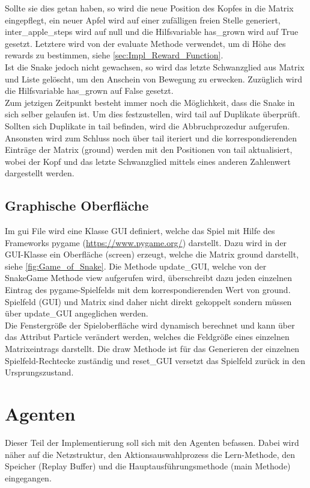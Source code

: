Sollte sie dies getan haben, so wird die neue Position des Kopfes in die Matrix eingepflegt, ein neuer Apfel wird auf einer zufälligen freien Stelle generiert, inter\_apple\_steps wird auf null und die Hilfsvariable has\_grown wird auf True gesetzt. Letztere wird von der evaluate Methode verwendet, um di Höhe des rewards zu bestimmen, siehe \ref{sec:Impl_Reward_Function}.\\
Ist die Snake jedoch nicht gewachsen, so wird das letzte Schwanzglied aus Matrix und Liste gelöscht, um den Anschein von Bewegung zu erwecken. Zuzüglich wird  die Hilfsvariable has\_grown auf False gesetzt.\\
Zum jetzigen Zeitpunkt besteht immer noch die Möglichkeit, dass die Snake in sich selber gelaufen ist. Um dies festzustellen, wird tail auf Duplikate überprüft. Sollten sich Duplikate in tail befinden, wird die Abbruchprozedur aufgerufen.\\
Ansonsten wird zum Schluss noch über tail iteriert und die korrespondierenden Einträge der Matrix (ground) werden mit den Positionen von tail aktualisiert, wobei der Kopf und das letzte Schwanzglied mittels eines anderen Zahlenwert dargestellt werden.


\subsection{Graphische Oberfläche} \label{sec:Impl_GUI}
Im gui File wird eine Klasse GUI definiert, welche das Spiel mit Hilfe des Frameworks pygame (\url{https://www.pygame.org/}) darstellt. Dazu wird in der GUI-Klasse ein Oberfläche (screen) erzeugt, welche die Matrix ground darstellt, siehe \ref{fig:Game_of_Snake}. 
Die Methode update\_GUI, welche von der SnakeGame Methode view aufgerufen wird, überschreibt dazu jeden einzelnen Eintrag des pygame-Spielfelds mit dem korrespondierenden Wert von ground. 
Spielfeld (GUI) und Matrix sind daher nicht direkt gekoppelt sondern müssen über update\_GUI angeglichen werden.\\
Die Fenstergröße der Spieloberfläche wird dynamisch berechnet und kann über das Attribut Particle verändert werden, welches die Feldgröße eines einzelnen Matrixeintrags darstellt. 
Die draw Methode ist für das Generieren der einzelnen Spielfeld-Rechtecke zuständig und reset\_GUI versetzt das Spielfeld zurück in den Ursprungszustand.



\section{Agenten}
Dieser Teil der Implementierung soll sich mit den Agenten befassen. Dabei wird näher auf die Netzstruktur, den Aktionsauswahlprozess die Lern-Methode, den Speicher (Replay Buffer) und die Hauptausführungsmethode (main Methode) eingegangen.

